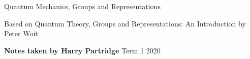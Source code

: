 \begin{titlepage}
    \begin{center}
    \vspace*{15em}
    \begin{Huge}
        Quantum Mechanics, Groups and Representations
    \end{Huge}
    \vspace{2em}

    \begin{Large}
    Based on Quantum Theory, Groups and Representations: An Introduction by Peter Woit
    \end{Large}

    \vspace{1em}
    \textbf{Notes taken by Harry Partridge}
    \vfill
    Term 1 2020
    \end{center}
 \end{titlepage}